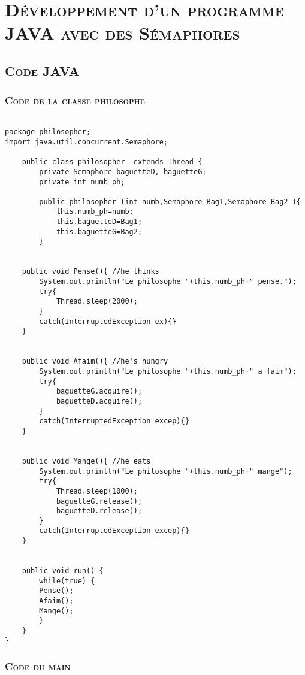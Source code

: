 \chapter{\textsc{Développement d'un programme JAVA avec des Sémaphores}}
\section{\textsc{Code JAVA}}

\subsection{\textsc{Code de la classe philosophe}}
	\begin{lstlisting}
		
package philosopher;
import java.util.concurrent.Semaphore;

	public class philosopher  extends Thread {
		private Semaphore baguetteD, baguetteG;
		private int numb_ph;
	
		public philosopher (int numb,Semaphore Bag1,Semaphore Bag2 ){
			this.numb_ph=numb;
			this.baguetteD=Bag1;
			this.baguetteG=Bag2;
		}
	
	
	public void Pense(){ //he thinks
		System.out.println("Le philosophe "+this.numb_ph+" pense.");
		try{
			Thread.sleep(2000);
		}
		catch(InterruptedException ex){}
	}

	
	public void Afaim(){ //he's hungry
		System.out.println("Le philosophe "+this.numb_ph+" a faim");
		try{
			baguetteG.acquire();
			baguetteD.acquire();
		}
		catch(InterruptedException excep){}
	}
	
	
	public void Mange(){ //he eats
		System.out.println("Le philosophe "+this.numb_ph+" mange");
		try{
			Thread.sleep(1000);
			baguetteG.release();
			baguetteD.release();
		}
		catch(InterruptedException excep){}
	}
	
	
	public void run() {
		while(true) {
		Pense();
		Afaim();
		Mange();
		}
	}
}

	\end{lstlisting}


\subsection{\textsc{Code du main}}

